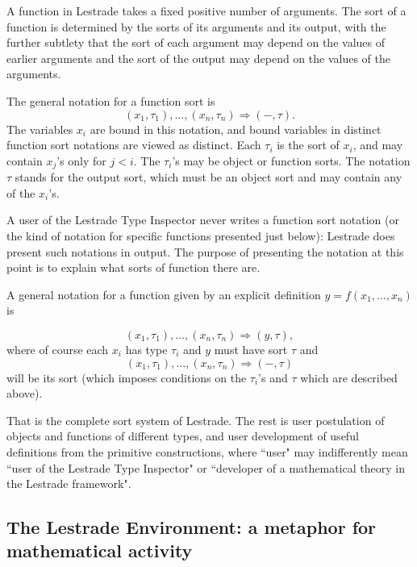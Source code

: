 \documentclass[12pt]{article}
\begin{document}
A function in Lestrade takes a fixed positive number of arguments.  The sort of a function is determined by the sorts of its arguments and its output,
with the further subtlety that the sort of each argument may depend on the values of earlier arguments and the sort of the output may depend on the values of the arguments.

The general notation for a function sort is $$(x_1,\tau_1),\ldots,(x_n,\tau_n)\Rightarrow (-,\tau).$$  The variables $x_i$ are bound in this notation, and bound variables in distinct function sort notations are viewed as distinct.  Each $\tau_i$ is the sort of $x_i$, and may contain $x_j$'s only for $j<i$.  The $\tau_i$'s may be object or function sorts.  The notation $\tau$ stands for the output sort, which must be an object sort and may contain any of the $x_i$'s.

A user of the Lestrade Type Inspector never writes a function sort notation (or the  kind of notation for specific functions presented just below):  Lestrade does present such notations in output.  The purpose of presenting the notation at this point is to explain what sorts of function there are.

A general notation for a function given by an explicit definition $y=f(x_1,\ldots,x_n)$ is

$$(x_1,\tau_1),\ldots,(x_n,\tau_n)\Rightarrow (y,\tau),$$  where of course each $x_i$ has type $\tau_i$ and $y$ must have sort $\tau$ and $$(x_1,\tau_1),\ldots,(x_n,\tau_n)\Rightarrow (-,\tau)$$ will be its sort (which imposes conditions on the $\tau_i$'s and $\tau$ which are described above).

That is the complete sort system of Lestrade.  The rest is user postulation of objects and functions of different types, and user development of useful definitions from the primitive constructions, where ``user" may indifferently mean ``user of the Lestrade Type Inspector" or ``developer of a mathematical theory in the Lestrade framework".

\subsection{The Lestrade Environment:  a metaphor for mathematical activity}
\end{document}
